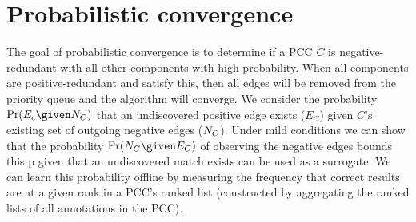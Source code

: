 \section{Probabilistic convergence}\label{sec:coverge}

The goal of probabilistic convergence is to determine if a PCC $C$ is
  negative-redundant with all other components with high probability.
When all components are positive-redundant and satisfy this, then all edges
  will be removed from the priority queue and the algorithm will converge.
We consider the probability $\Pr(E_c \given \nT_C)$ that an undiscovered
  positive edge exists ($E_C$) given $C$'s existing set of outgoing negative
  edges ($N_C$).
Under mild conditions %
we can show that the probability $\Pr(\nT_C \given E_C)$ of observing the
  negative edges bounds this p given that an undiscovered match exists can be
  used as a surrogate.
We can learn this probability offline by measuring the frequency that correct
  results are at a given rank in a PCC's ranked list (constructed by aggregating
  the ranked lists of all annotations in the PCC).





